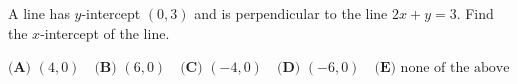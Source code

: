 A line has $y$-intercept $(0,3)$ and is perpendicular to the line $2x+y=3$. Find the $x$-intercept of the line.

$\textbf{(A) }(4,0)\quad\textbf{(B) }(6,0)\quad\textbf{(C) }(-4,0)\quad\textbf{(D) }(-6,0)\quad\textbf{(E) }\text{none of the above}$
